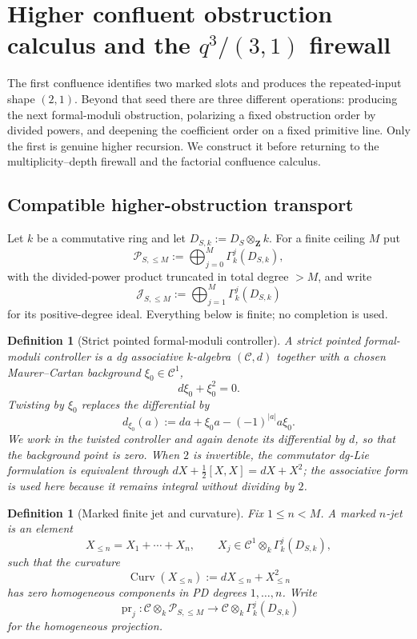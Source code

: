 \documentclass[11pt]{article}
\newtheorem{definition}[theorem]{Definition}
\theoremstyle{remark}
\newcommand{\Z}{\mathbf Z}
\begin{document}
\section{Higher confluent obstruction calculus and the $q^3/(3,1)$ firewall}\label{P1C-sec:iterated-confluence}

The first confluence identifies two marked slots and produces the repeated-input shape $(2,1)$.  Beyond that seed there are three different operations: producing the next formal-moduli obstruction, polarizing a fixed obstruction order by divided powers, and deepening the coefficient order on a fixed primitive line.  Only the first is genuine higher recursion.  We construct it before returning to the multiplicity--depth firewall and the factorial confluence calculus.

\subsection{Compatible higher-obstruction transport}\label{P1C-subsec:higher-obstruction-recursion}

Let $k$ be a commutative ring and let $D_{S,k}:=D_S\otimes_\Z k$.  For a finite ceiling $M$ put
\[
 \mathscr P_{S,\le M}
 :=\bigoplus_{j=0}^{M}\Gamma_k^j(D_{S,k}),
\]
with the divided-power product truncated in total degree $>M$, and write
\[
 \mathscr J_{S,\le M}:=\bigoplus_{j=1}^{M}\Gamma_k^j(D_{S,k})
\]
for its positive-degree ideal.  Everything below is finite; no completion is used.

\begin{definition}[Strict pointed formal-moduli controller]\label{P1C-def:strict-formal-moduli-controller}
A \emph{strict pointed formal-moduli controller} is a dg associative $k$-algebra $(\mathscr C,d)$ together with a chosen Maurer--Cartan background $\xi_0\in\mathscr C^1$,
\[
 d\xi_0+\xi_0^2=0.
\]
Twisting by $\xi_0$ replaces the differential by
\[
 d_{\xi_0}(a)
 :=da+\xi_0a-(-1)^{|a|}a\xi_0.
\]
We work in the twisted controller and again denote its differential by $d$, so that the background point is zero.  When $2$ is invertible, the commutator dg-Lie formulation is equivalent through $dX+\frac12[X,X]=dX+X^2$; the associative form is used here because it remains integral without dividing by $2$.
\end{definition}

\begin{definition}[Marked finite jet and curvature]\label{P1C-def:marked-finite-mc-jet}
Fix $1\le n<M$.  A \emph{marked $n$-jet} is an element
\[
 X_{\le n}=X_1+\cdots+X_n,
 \qquad
 X_j\in\mathscr C^1\otimes_k\Gamma_k^j(D_{S,k}),
\]
such that the curvature
\[
 \operatorname{Curv}(X_{\le n})
 :=dX_{\le n}+X_{\le n}^2
\]
has zero homogeneous components in PD degrees $1,\ldots,n$.  Write
\[
 \operatorname{pr}_j:
 \mathscr C\otimes_k\mathscr P_{S,\le M}
 \longrightarrow
 \mathscr C\otimes_k\Gamma_k^j(D_{S,k})
\]
for the homogeneous projection.
\end{definition}
\end{document}
